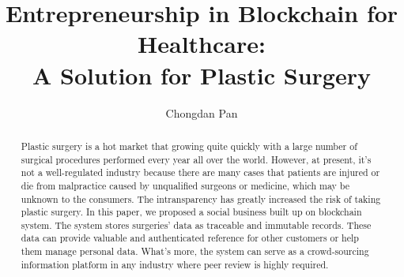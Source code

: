 \documentclass{article}
\title{Entrepreneurship in Blockchain for Healthcare: \\A Solution for Plastic Surgery}
\author{Chongdan Pan}
\begin{document}
\maketitle

\begin{abstract}
Plastic surgery is a hot market that growing quite quickly with a large number of surgical procedures performed every year all over the world. However, at present, it's not a well-regulated industry because there are many cases that patients are injured or die from malpractice caused by unqualified surgeons or medicine, which may be unknown to the consumers. The intransparency has greatly increased the risk of taking plastic surgery. In this paper, we proposed a social business built up on blockchain system. The system stores surgeries' data as traceable and immutable records. These data can provide valuable and authenticated reference for other customers or help them manage personal data. What's more, the system can serve as a crowd-sourcing information platform in any industry where peer review is highly required.
\end{abstract}
\end{document}
